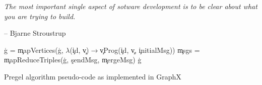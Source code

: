 \epigraph{\textit{The most important single aspect of sotware development is to be clear about what you are trying to build.}}{-- \textup{Bjarne Stroustrup}}

\begin{algorithm}[!hbt]
    \DontPrintSemicolon
    \SetAlgoVlined
    \blockskip
    \c{g} = \c{mapVertices}(\c{g}, $\lambda$(\c{id}, \c{v})$\rightarrow$\c{vProg}(\c{id}, \c{v}, \c{initialMsg}))  \;
    \c{msgs} = \c{mapReduceTriples}(\c{g}, \c{sendMsg}, \c{mergeMsg}) \;
    \Return\c{g}
    \caption{Pregel algorithm pseudo-code as implemented in GraphX~\cite{https://doi.org/10.48550/arxiv.2110.11709}}
\end{algorithm}

